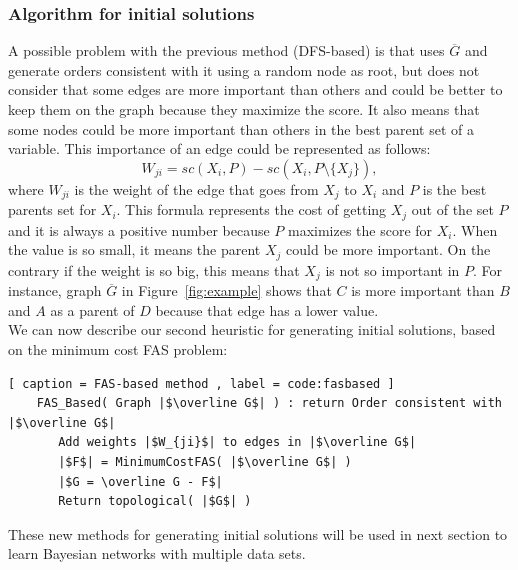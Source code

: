\subsubsection{Algorithm for initial solutions}
\label{subsub:fasalgorithm}
	A possible problem with the previous method (DFS-based) is that uses $\overline G$ and generate orders consistent with it using a random node as root, but does not consider that some edges are more important than others and could be better to keep them on the graph because they maximize the score. It also means that some nodes could be more important than others in the best parent set of a variable. This importance of an edge could be represented as follows:
		\begin{equation}
			\label{eq:weight}
			W_{ji} = {sc}( X_i , P ) - {sc}( X_i , P \setminus \{ X_j \} ) ,
		\end{equation}
	where $W_{ji}$ is the weight of the edge that goes from $X_j$ to $X_i$ and $P$ is the best parents set for $X_i$. This formula represents the cost of getting $X_j$ out of the set $P$ and it is always a positive number because $P$ maximizes the score for $X_i$. When the value is so small, it means the parent $X_j$ could be more important. On the contrary if the weight is so big, this means that $X_j$ is not so important in $P$. For instance, graph $\overline G$ in Figure~\ref{fig:example} shows that $C$ is more important than $B$ and $A$ as a parent of $D$ because that edge has a lower value.\\
        We can now describe our second heuristic for generating initial solutions, based on the minimum cost FAS problem:
	\begin{lstlisting}[ caption = FAS-based method , label = code:fasbased ]
	FAS_Based( Graph |$\overline G$| ) : return Order consistent with |$\overline G$|
	   Add weights |$W_{ji}$| to edges in |$\overline G$|
	   |$F$| = MinimumCostFAS( |$\overline G$| )
	   |$G = \overline G - F$|
	   Return topological( |$G$| )
	\end{lstlisting}

These new methods for generating initial solutions will be used in next section to learn Bayesian networks with multiple data sets.